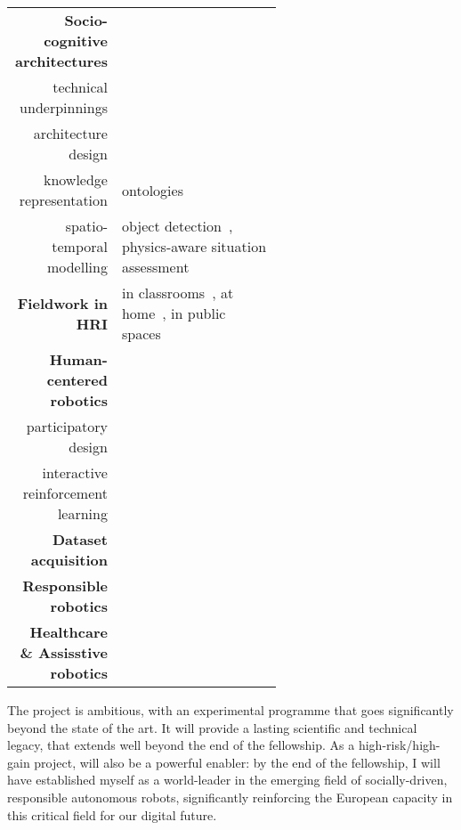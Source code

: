 \begin{table}[h]
\begin{tabular}{rp{0.6\linewidth}}
        \midrule
        \textbf{Socio-cognitive architectures} \\
        technical underpinnings & \small \cite{mallet2010genom3,lemaignan2015pyrobots,mohamed2021ros4hri} \\
        architecture design & \small \cite{lemaignan2017artificial, baxter2016cognitive,lemaignan2014challenges,lallee2012towards, mallet2010genom3} \\
        knowledge representation & \small
        ontologies~\cite{lemaignan2010oro, lemaignan2013explicit} \\    
        spatio-temporal modelling & \small object
        detection~\cite{wallbridge2017qualitative}, physics-aware situation
        assessment~\cite{lemaignan2018underworlds,sallami2019simulation} \\
        \midrule
        \textbf{Fieldwork in HRI} & \small in
        classrooms~\cite{hood2015when, lemaignan2016learning, jacq2016building,
        baxter2015wider,kennedy2016cautious,senft2018robots,lemaignan2022social},
        at home~\cite{mondada2015ranger}, in public
        spaces~\cite{alhafnawi2022deliberative}\\
        \midrule
        \textbf{Human-centered robotics} \\
        participatory design & \small \cite{winkle2018social}\\
        interactive reinforcement learning & \small \cite{senft2017leveraging,senft2017supervised, senft2019teaching,winkle2020couch, winkle2020insitu,winkle2021leador} \\        
        \midrule
        \textbf{Dataset acquisition} & \small \cite{kennedy2017child,lemaignan2018pinsoro,sallami2020unexpected,webb2023sogrin} \\
        \midrule
        \textbf{Responsible robotics} & \small \cite{lemaignan2021unicef} \\
        \midrule
        \textbf{Healthcare \& Assisstive robotics} & \small
        \cite{winkle2018social,cooper2023challenges} \\
        \bottomrule
    \end{tabular}
    \label{pi-expertise}
\end{table}

The project is ambitious, with an experimental programme that goes significantly
beyond the state of the art. It will provide a lasting scientific and
technical legacy, that extends well beyond the end of the fellowship. As a
high-risk/high-gain project, \project will also be a powerful enabler: by the
end of the fellowship, I will have established myself as a world-leader in the
emerging field of socially-driven, responsible autonomous robots, significantly
reinforcing the European capacity in this critical field for our digital future.



\newpage

\printbibliography



